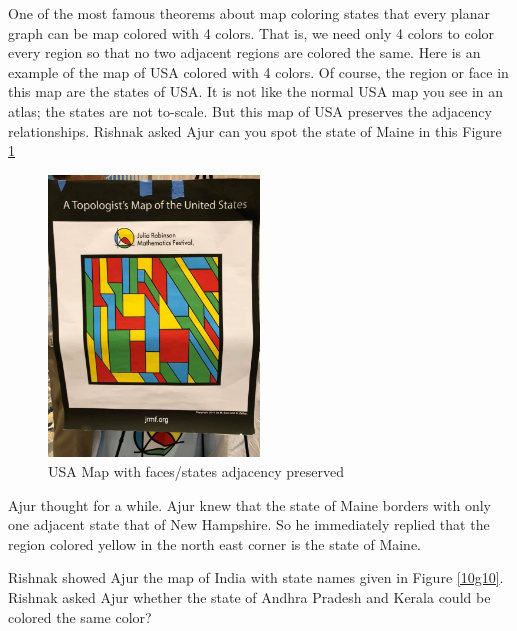 One of the most famous theorems about map coloring states that every planar graph can be map colored with 4 colors. That is, we need only 4 colors to color every region so that no two adjacent regions are colored the same. Here is an example of the map of USA colored with 4 colors. Of course, the region or face in this map are the states of USA. It is not like the normal USA map you see in an atlas; the states are not to-scale. But this map of USA preserves the adjacency relationships. Rishnak asked Ajur can you spot the state of Maine in this Figure \ref{10g9}
\begin{figure}
\begin{center}
\includegraphics[width=0.5\textwidth]{usamap.png}
\end{center}
\caption{USA Map with faces/states adjacency preserved}\label{10g9}
\end{figure}

Ajur thought for a while. Ajur knew that the state of Maine borders with only one adjacent state that of New Hampshire. So he immediately replied that the region colored yellow in the north east corner is the state of Maine.

Rishnak showed Ajur the map of India with state names given in Figure \ref{10g10}. Rishnak asked Ajur whether the state of Andhra Pradesh and Kerala could be colored the same color?

